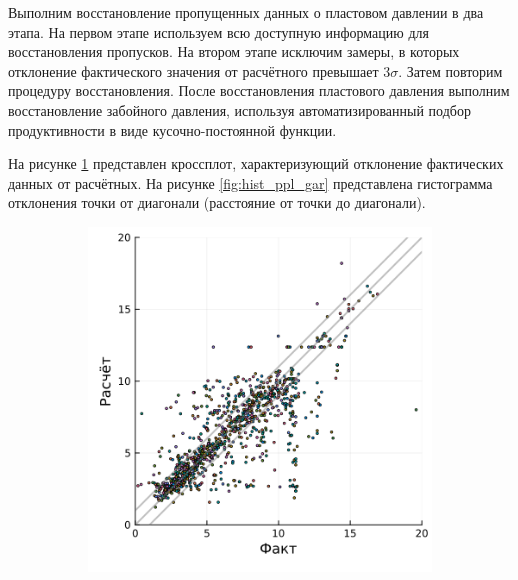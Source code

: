 \documentclass[14pt]{article}
\begin{document}
Выполним восстановление пропущенных данных о пластовом давлении в два этапа.
На первом этапе используем всю доступную информацию для восстановления пропусков. На втором этапе исключим замеры, в которых отклонение фактического значения от расчётного превышает $3\sigma$. Затем повторим процедуру восстановления.
После восстановления пластового давления выполним восстановление забойного давления, используя автоматизированный подбор продуктивности в виде кусочно-постоянной функции.

На рисунке \ref{fig:cp_ppl_gar} представлен кроссплот, характеризующий отклонение фактических данных от расчётных. 
На рисунке \ref{fig:hist_ppl_gar} представлена гистограмма отклонения точки от диагонали (расстояние от точки до диагонали). 
\begin{figure}[!htb]
	\begin{subfigure}[b]{0.45\linewidth}
		\includegraphics[width=\linewidth]{pic/gar_cp}
		\caption{}
		\label{fig:cp_ppl_gar}
	\end{subfigure}
	\begin{subfigure}[b]{0.45\linewidth}

\end{subfigure}
\end{figure}
\end{document}
